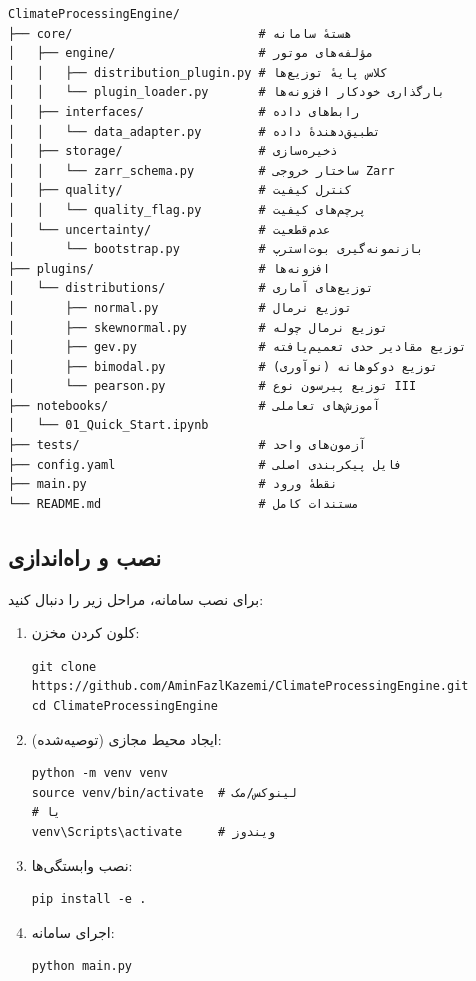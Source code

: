\documentclass[a4paper,12pt]{article}
\begin{document}
\begin{verbatim}
ClimateProcessingEngine/
├── core/                          # هستهٔ سامانه
│   ├── engine/                    # مؤلفه‌های موتور
│   │   ├── distribution_plugin.py # کلاس پایهٔ توزیع‌ها
│   │   └── plugin_loader.py       # بارگذاری خودکار افزونه‌ها
│   ├── interfaces/                # رابط‌های داده
│   │   └── data_adapter.py        # تطبیق‌دهندهٔ داده
│   ├── storage/                   # ذخیره‌سازی
│   │   └── zarr_schema.py         # ساختار خروجی Zarr
│   ├── quality/                   # کنترل کیفیت
│   │   └── quality_flag.py        # پرچم‌های کیفیت
│   └── uncertainty/               # عدم‌قطعیت
│       └── bootstrap.py           # بازنمونه‌گیری بوت‌استرپ
├── plugins/                       # افزونه‌ها
│   └── distributions/             # توزیع‌های آماری
│       ├── normal.py              # توزیع نرمال
│       ├── skewnormal.py          # توزیع نرمال چوله
│       ├── gev.py                 # توزیع مقادیر حدی تعمیم‌یافته
│       ├── bimodal.py             # توزیع دوکوهانه (نوآوری)
│       └── pearson.py             # توزیع پیرسون نوع III
├── notebooks/                     # آموزش‌های تعاملی
│   └── 01_Quick_Start.ipynb
├── tests/                         # آزمون‌های واحد
├── config.yaml                    # فایل پیکربندی اصلی
├── main.py                        # نقطهٔ ورود
└── README.md                      # مستندات کامل
\end{verbatim}

\subsection{نصب و راه‌اندازی}

برای نصب سامانه، مراحل زیر را دنبال کنید:

\begin{enumerate}
\item کلون کردن مخزن:
\begin{verbatim}
git clone https://github.com/AminFazlKazemi/ClimateProcessingEngine.git
cd ClimateProcessingEngine
\end{verbatim}

\item ایجاد محیط مجازی (توصیه‌شده):
\begin{verbatim}
python -m venv venv
source venv/bin/activate  # لینوکس/مک
# یا
venv\Scripts\activate     # ویندوز
\end{verbatim}

\item نصب وابستگی‌ها:
\begin{verbatim}
pip install -e .
\end{verbatim}

\item اجرای سامانه:
\begin{verbatim}
python main.py
\end{verbatim}
\end{enumerate}
\end{document}
